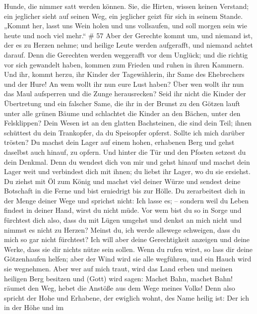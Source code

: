 Hunde, die nimmer satt werden können. Sie, die Hirten, wissen keinen
Verstand; ein jeglicher sieht auf seinen Weg, ein jeglicher geizt für
sich in seinem Stande.  „Kommt her, lasst uns Wein holen
und uns vollsaufen, und soll morgen sein wie heute und noch viel mehr.``
\# 57  Aber der Gerechte kommt um, und niemand ist, der es
zu Herzen nehme; und heilige Leute werden aufgerafft, und niemand achtet
darauf. Denn die Gerechten werden weggerafft vor dem Unglück;
 und die richtig vor sich gewandelt haben, kommen zum
Frieden und ruhen in ihren Kammern.  Und ihr, kommt herzu,
ihr Kinder der Tagewählerin, ihr Same des Ehebrechers und der Hure!
 An wem wollt ihr nun eure Lust haben? Über wen wollt ihr
nun das Maul aufsperren und die Zunge herausrecken? Seid ihr nicht die
Kinder der Übertretung und ein falscher Same,  die ihr in
der Brunst zu den Götzen lauft unter alle grünen Bäume und schlachtet
die Kinder an den Bächen, unter den Felsklippen?  Dein Wesen
ist an den glatten Bachsteinen, die sind dein Teil; ihnen schüttest du
dein Trankopfer, da du Speisopfer opferst. Sollte ich mich darüber
trösten?  Du machst dein Lager auf einem hohen, erhabenen
Berg und gehst daselbst auch hinauf, zu opfern.  Und hinter
die Tür und den Pfosten setzest du dein Denkmal. Denn du wendest dich
von mir und gehst hinauf und machst dein Lager weit und verbindest dich
mit ihnen; du liebst ihr Lager, wo du sie ersiehst.  Du
ziehst mit Öl zum König und machst viel deiner Würze und sendest deine
Botschaft in die Ferne und bist erniedrigt bis zur Hölle. 
Du zerarbeitest dich in der Menge deiner Wege und sprichst nicht: Ich
lasse es; -- sondern weil du Leben findest in deiner Hand, wirst du
nicht müde.  Vor wem bist du so in Sorge und fürchtest dich
also, dass du mit Lügen umgehst und denkst an mich nicht und nimmst es
nicht zu Herzen? Meinst du, ich werde allewege schweigen, dass du mich
so gar nicht fürchtest?  Ich will aber deine Gerechtigkeit
anzeigen und deine Werke, dass sie dir nichts nütze sein sollen.
 Wenn du rufen wirst, so lass dir deine Götzenhaufen
helfen; aber der Wind wird sie alle wegführen, und ein Hauch wird sie
wegnehmen. Aber wer auf mich traut, wird das Land erben und meinen
heiligen Berg besitzen  und (Gott) wird sagen: Machet Bahn,
machet Bahn! räumet den Weg, hebet die Anstöße aus dem Wege meines
Volks!  Denn also spricht der Hohe und Erhabene, der
ewiglich wohnt, des Name heilig ist: Der ich in der Höhe und im
